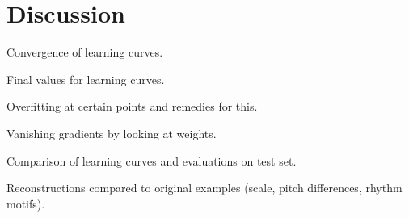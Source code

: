 \section{Discussion}
\label{sec:discussion}

Convergence of learning curves.

Final values for learning curves.

Overfitting at certain points and remedies for this.

Vanishing gradients by looking at weights.

Comparison of learning curves and evaluations on test set.

Reconstructions compared to original examples (scale, pitch differences, rhythm motifs).
